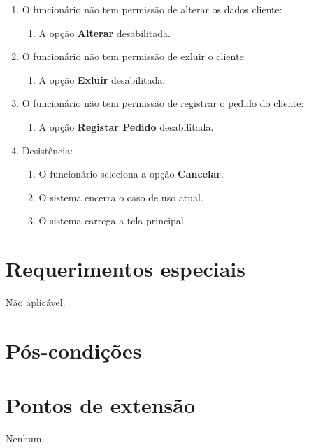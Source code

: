 \begin{enumerate}
	\item O funcionário não tem permissão de alterar os dados cliente:
	\begin{enumerate}
		\item A opção \textbf{Alterar} desabilitada.
	\end{enumerate}
	\item O funcionário não tem permissão de exluir o cliente:
	\begin{enumerate}
		\item A opção \textbf{Exluir} desabilitada.
	\end{enumerate}
	\item O funcionário não tem permissão de registrar o pedido do cliente:
	\begin{enumerate}
		\item A opção \textbf{Registar Pedido} desabilitada.
	\end{enumerate}	
	\item Desistência:
	\begin{enumerate}
		\item O funcionário seleciona a opção \textbf{Cancelar}.
		\item O sistema encerra o caso de uso atual.
		\item O sistema carrega a tela principal.
	\end{enumerate}
\end{enumerate}

\section{Requerimentos especiais}

Não aplicável.

\section{Pós-condições}

\section{Pontos de extensão}

Nenhum.